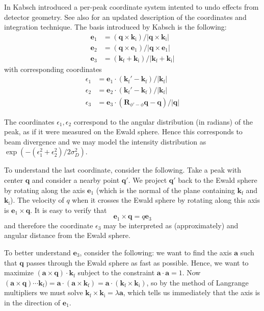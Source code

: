 \documentclass[11pt,a4paper]{article}
\def\v#1{\bm{{#1}}}
\def\si{\text{i}}
\def\sf{\text{f}}
\def\ba{\v{a}}
\def\be{{\v{e}}}
\def\k{{\v{k}}}
\def\q{{\v{q}}}
\begin{document}
In \cite{Kab88b} Kabsch introduced a per-peak coordinate system intented to undo effects from detector geometry.
See also \cite{Kab10b} for an updated description of the coordinates and integration technique.
The basis introduced by Kabsch is the following:
\begin{align}
  \be_1 &= (\q \times \k_\si) / |\q \times \k_\si| \\
  \be_2 &= (\q \times \be_1) / |\q \times \be_1| \\
  \be_3 &= (\k_\sf + \k_\si) / |\k_\sf + \k_\si|
\end{align}
with corresponding coordinates
\begin{align}
  \epsilon_1 &= \be_1 \cdot (\k_\sf'-\k_\sf) / |\k_\sf| \\
  \epsilon_2 &= \be_2 \cdot (\k_\sf'-\k_\sf) / |\k_\sf| \\
  \epsilon_3 &= \be_3 \cdot (\v{R}_{\phi'-\phi}\q-\q) / |\q|
\end{align}

The coordinates $\epsilon_1, \epsilon_2$ correspond to the angular distribution (in radians) of the peak, as if it were measured on the Ewald sphere. Hence this corresponds to beam divergence and we may model the intensity distribution as $\exp(-(\epsilon_1^2 + \epsilon_2^2)/2 \sigma_D^2)$.

To understand the last coordinate, consider the following. Take a peak with center $\q$ and consider a nearby point $\q'$. We project $\q'$ back to the Ewald sphere by rotating along the axis $\be_1$ (which is the normal of the plane containing $\k_\sf$ and $\k_\si$). The velocity of $q$ when it crosses the Ewald sphere by rotating along this axis is $\be_1 \times \q$. It is easy to verify that
\begin{equation} \be_1 \times \q = q \be_3 \end{equation}
and therefore the coordinate $\epsilon_3$ may be interpreted as (approximately) and angular distance from the Ewald sphere.

To better understand $\be_3$, consider the following: we want to find the axis $\ba$ such that $\q$ passes through the Ewald sphere as fast as possible. Hence, we want to maximize $(\ba \times \q) \cdot \k_\sf$ subject to the constraint $\ba \cdot \ba = 1$.
Now $(\ba \times \q) \cdots \k_\sf) = \ba \cdot (\ba \times \k_\sf) = \ba \cdot (\k_\sf \times \k_\si)$, so by the method of Langrange multipliers we must solve $\k_\sf \times \k_\si = \lambda \ba$, which tells us immediately that the axis is in the direction of $\be_1$.
\end{document}
